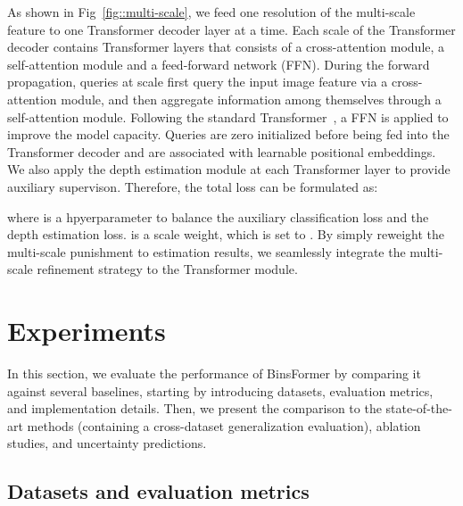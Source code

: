 \documentclass[runningheads]{llncs}
\begin{document}
As shown in Fig~\ref{fig::multi-scale}, we feed one resolution of the multi-scale feature  to one Transformer decoder layer at a time. Each scale of the Transformer decoder contains  Transformer layers that consists of a cross-attention module, a self-attention module and a feed-forward network (FFN). During the forward propagation, queries at scale  first query the input image feature  via a cross-attention module, and then aggregate information among themselves through a self-attention module. Following the standard Transformer~\cite{vaswani2017attention}, a FFN is applied to improve the model capacity. Queries are zero initialized before being fed into the Transformer decoder and are associated with learnable positional embeddings. We also apply the depth estimation module at each Transformer layer to provide auxiliary supervison. Therefore, the total loss can be formulated as:

\noindent where  is a hpyerparameter to balance the auxiliary classification loss and the depth estimation loss.  is a scale weight, which is set to . By simply reweight the multi-scale punishment to estimation results, we seamlessly integrate the multi-scale refinement strategy to the Transformer module. 






 \section{Experiments}
\label{sec:experiments}
In this section, we evaluate the performance of BinsFormer by comparing it against several baselines, starting by introducing datasets, evaluation metrics, and implementation details. Then, we present the comparison to the state-of-the-art methods (containing a cross-dataset generalization evaluation), ablation studies, and uncertainty predictions.

\subsection{Datasets and evaluation metrics}
\end{document}
